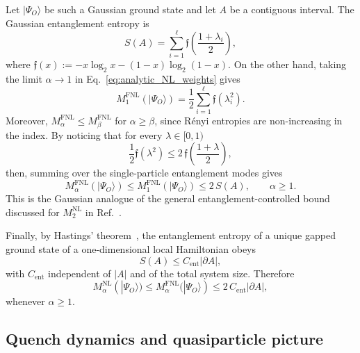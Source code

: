 \documentclass[prx,twocolumn,superscriptaddress,aps,10pt, frontmatterverbose, reprint,footinbib,longbibliography=true]{revtex4-2}
\newcommand{\RENYI}{\alpha}
\begin{document}
Let $|\Psi_O\rangle$ be such a Gaussian ground state and let $A$ be a contiguous interval. The Gaussian entanglement entropy is
\begin{equation}
    S(A)=
    \sum_{i=1}^{\ell}
    \mathfrak{f}\!\left(\frac{1+\lambda_i}{2}\right),
    \label{eq:gaussian_entropy_area_law_sec}
\end{equation}
where $\mathfrak{f}(x):=-x\log_2x-(1-x)\log_2(1-x)$. On the other hand, taking the limit \(\RENYI\to1\) in Eq.~\eqref{eq:analytic_NL_weights} gives
\begin{equation}
    M_{1}^{\mathrm{FNL}}(|\Psi_O\rangle)
    =
    \frac{1}{2}
    \sum_{i=1}^{\ell}
    \mathfrak{f}(\lambda_i^2).
    \label{eq:M1_FNL}
\end{equation}
Moreover, $M_{\alpha}^{\mathrm{FNL}}\le M_{\beta}^{\mathrm{FNL}}$ for $\alpha\ge\beta$, since R\'enyi entropies are non-increasing in the index. By noticing that for every $\lambda\in[0,1)$
\begin{equation}
    \frac{1}{2}\mathfrak{f}(\lambda^2)
    \le
    2\, \mathfrak{f}\!\left(\frac{1+\lambda}{2}\right),
    \label{eq:m1_entropy_bound}
\end{equation}
then, summing over the single-particle entanglement modes gives
\begin{equation}
    M_{\RENYI}^{\mathrm{FNL}}(|\Psi_O\rangle)
    \le
    M_{1}^{\mathrm{FNL}}(|\Psi_O\rangle)
    \le
    2\, S(A),
    \qquad
    \RENYI\ge1.
    \label{eq:FNL_bound_by_entropy_all_alpha}
\end{equation}
This is the Gaussian analogue of the general entanglement-controlled bound discussed for $M_2^{\mathrm{NL}}$ in Ref.~\cite{Cao_2025}.

Finally, by Hastings' theorem~\cite{Hastings_2007}, the entanglement entropy of a unique gapped ground state of a one-dimensional local Hamiltonian obeys
\begin{equation}
    S(A)\le C_{\mathrm{ent}}|\partial A|,
    \label{eq:Hastings_area_law}
\end{equation}
with $C_{\mathrm{ent}}$ independent of $|A|$ and of the total system size. Therefore
\begin{equation}
    M_{\RENYI}^{\mathrm{NL}}(|\Psi_O\rangle)
    \le
    M_{\RENYI}^{\mathrm{FNL}}(|\Psi_O\rangle)
    \le
    2\, C_{\mathrm{ent}}|\partial A|,
    \label{eq:FNL_area_law_final}
\end{equation}
whenever $\RENYI\ge1$. 

\subsection{Quench dynamics and quasiparticle picture}
\end{document}

